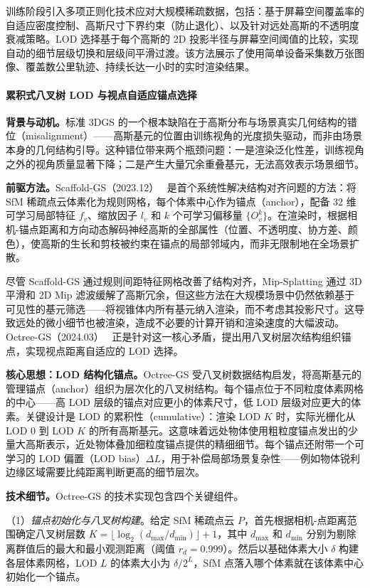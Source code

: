 训练阶段引入多项正则化技术应对大规模稀疏数据，包括：基于屏幕空间覆盖率的自适应密度控制、高斯尺寸下界约束（防止退化）、以及针对远处高斯的不透明度衰减策略。LOD 选择基于每个高斯的 2D 投影半径与屏幕空间阈值的比较，实现自动的细节层级切换和层级间平滑过渡。该方法展示了使用简单设备采集数万张图像、覆盖数公里轨迹、持续长达一小时的实时渲染结果。

\paragraph{累积式八叉树 LOD 与视点自适应锚点选择}

\textbf{背景与动机。}标准 3DGS 的一个根本缺陷在于高斯分布与场景真实几何结构的错位（misalignment）——高斯基元的位置由训练视角的光度损失驱动，而非由场景本身的几何结构引导。这种错位带来两个瓶颈问题：一是渲染泛化性差，训练视角之外的视角质量显著下降；二是产生大量冗余重叠基元，无法高效表示场景细节。

\textbf{前驱方法。}Scaffold-GS（2023.12）~\cite{2312_00109} 是首个系统性解决结构对齐问题的方法：将 SfM 稀疏点云体素化为规则网格，每个体素中心作为锚点（anchor），配备 32 维可学习局部特征 $f_v$、缩放因子 $l_v$ 和 $k$ 个可学习偏移量 $\{O_v^k\}$。在渲染时，根据相机-锚点距离和方向动态解码神经高斯的全部属性（位置、不透明度、协方差、颜色），使高斯的生长和剪枝被约束在锚点的局部邻域内，而非无限制地在全场景扩散。

尽管 Scaffold-GS 通过规则间距特征网格改善了结构对齐，Mip-Splatting 通过 3D 平滑和 2D Mip 滤波缓解了高斯冗余，但这些方法在大规模场景中仍然依赖基于可见性的基元筛选——将视锥体内所有基元纳入渲染，而不考虑其投影尺寸。这导致远处的微小细节也被渲染，造成不必要的计算开销和渲染速度的大幅波动。Octree-GS（2024.03）~\cite{2403_17898} 正是针对这一核心矛盾，提出用八叉树层次结构组织锚点，实现视点距离自适应的 LOD 选择。

\textbf{核心思想：LOD 结构化锚点。}Octree-GS 受八叉树数据结构启发，将高斯基元的管理锚点（anchor）组织为层次化的八叉树结构。每个锚点位于不同粒度体素网格的中心——高 LOD 层级的锚点对应更小的体素尺寸，低 LOD 层级对应更大的体素。关键设计是 LOD 的累积性（cumulative）：渲染 LOD $K$ 时，实际光栅化从 LOD 0 到 LOD $K$ 的所有高斯基元。这意味着远处物体使用粗粒度锚点发出的少量大高斯表示，近处物体叠加细粒度锚点提供的精细细节。每个锚点还附带一个可学习的 LOD 偏置（LOD bias）$\Delta L$，用于补偿局部场景复杂性——例如物体锐利边缘区域需要比纯距离判断更高的细节层次。

\textbf{技术细节。}Octree-GS 的技术实现包含四个关键组件。

（1）\textit{锚点初始化与八叉树构建}。给定 SfM 稀疏点云 $P$，首先根据相机-点距离范围确定八叉树层数 $K = \lfloor\log_2(d_{\max}/d_{\min})\rfloor + 1$，其中 $d_{\max}$ 和 $d_{\min}$ 分别为剔除离群值后的最大和最小观测距离（阈值 $r_d = 0.999$）。然后以基础体素大小 $\delta$ 构建各层体素网格，LOD $L$ 的体素大小为 $\delta / 2^L$，SfM 点落入哪个体素就在该体素中心初始化一个锚点。

